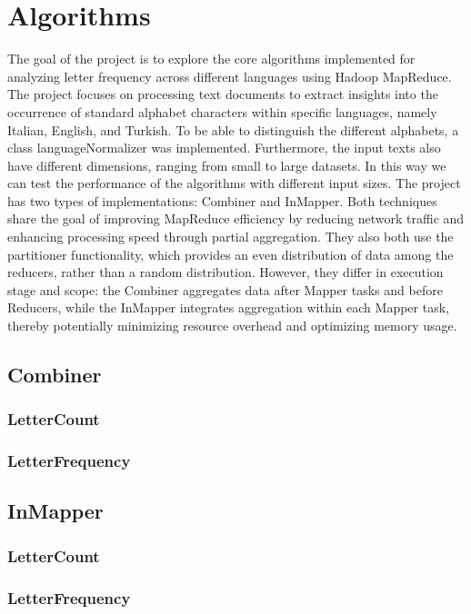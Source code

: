 \chapter{Algorithms}


The goal of the project is to explore the core algorithms implemented for analyzing letter frequency across different languages using Hadoop MapReduce. 
The project focuses on processing text documents to extract insights into the occurrence of standard alphabet characters within specific languages, namely Italian, English, and Turkish. 
To be able to distinguish the different alphabets, a class languageNormalizer was implemented. 
Furthermore, the input texts also have different dimensions, ranging from small to large datasets.
In this way we can test the performance of the algorithms with different input sizes.
The project has two types of implementations: Combiner and InMapper. Both techniques share the goal of improving MapReduce efficiency by reducing network traffic and enhancing processing speed through partial aggregation. They also both use the partitioner functionality, which provides an even distribution of data among the reducers, rather than a random distribution. However, they differ in execution stage and scope: the Combiner aggregates data after Mapper tasks and before Reducers, while the InMapper integrates aggregation within each Mapper task, thereby potentially minimizing resource overhead and optimizing memory usage. 

\section{Combiner}
\subsection{LetterCount}
\subsection{LetterFrequency}

\section{InMapper}
\subsection{LetterCount}
\subsection{LetterFrequency}